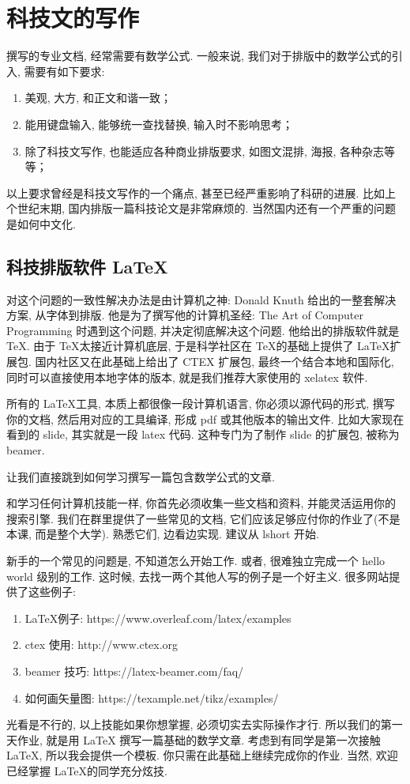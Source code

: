 \documentclass[a4paper]{ctexart}
\begin{document}
\section{科技文的写作}
撰写的专业文档, 经常需要有数学公式. 一般来说, 我们对于排版中的数学公式的引入,
需要有如下要求:
\begin{enumerate}
\item 美观, 大方, 和正文和谐一致；
\item 能用键盘输入, 能够统一查找替换, 输入时不影响思考；
\item 除了科技文写作, 也能适应各种商业排版要求, 如图文混排, 海报, 各种杂志等等；
\end{enumerate}

以上要求曾经是科技文写作的一个痛点, 甚至已经严重影响了科研的进展. 比如上个世纪末期,
国内排版一篇科技论文是非常麻烦的. 当然国内还有一个严重的问题是如何中文化.

\subsection{科技排版软件 \LaTeX}
对这个问题的一致性解决办法是由计算机之神: Donald Knuth 给出的一整套解决方案, 从字体到排版.
他是为了撰写他的计算机圣经: The Art of Computer Programming 时遇到这个问题,
并决定彻底解决这个问题. 他给出的排版软件就是 \TeX. 由于 \TeX 太接近计算机底层,
于是科学社区在 \TeX 的基础上提供了 \LaTeX 扩展包. 国内社区又在此基础上给出了 CTEX 扩展包,
最终一个结合本地和国际化, 同时可以直接使用本地字体的版本, 就是我们推荐大家使用的 xelatex 软件.

所有的 \LaTeX 工具, 本质上都很像一段计算机语言, 你必须以源代码的形式, 撰写你的文档,
然后用对应的工具编译, 形成 pdf 或其他版本的输出文件. 比如大家现在看到的 slide,
其实就是一段 latex 代码. 这种专门为了制作 slide 的扩展包, 被称为 beamer.

让我们直接跳到如何学习撰写一篇包含数学公式的文章. 

和学习任何计算机技能一样, 你首先必须收集一些文档和资料, 并能灵活运用你的搜索引擎.
我们在群里提供了一些常见的文档, 它们应该足够应付你的作业了(不是本课, 而是整个大学).
熟悉它们, 边看边实现. 建议从 lshort 开始.

新手的一个常见的问题是, 不知道怎么开始工作. 或者, 很难独立完成一个 hello world 级别的工作.
这时候, 去找一两个其他人写的例子是一个好主义. 很多网站提供了这些例子:

\begin{enumerate}
\item \LaTeX 例子: https://www.overleaf.com/latex/examples
\item ctex 使用: http://www.ctex.org  
\item beamer 技巧: https://latex-beamer.com/faq/
\item 如何画矢量图: https://texample.net/tikz/examples/
\end{enumerate}

光看是不行的, 以上技能如果你想掌握, 必须切实去实际操作才行. 所以我们的第一天作业, 就是用 \LaTeX
撰写一篇基础的数学文章. 考虑到有同学是第一次接触 \LaTeX, 所以我会提供一个模板.
你只需在此基础上继续完成你的作业. 当然, 欢迎已经掌握 \LaTeX 的同学充分炫技. 



\end{document}
